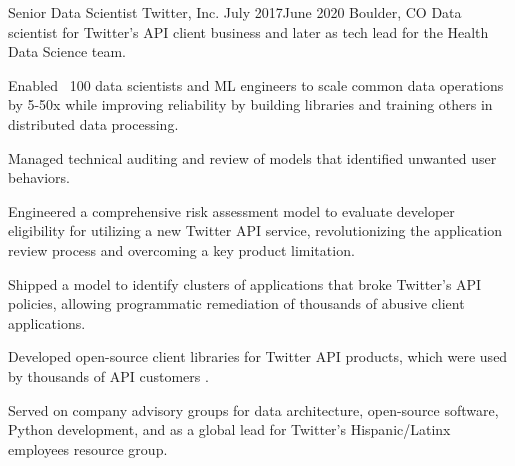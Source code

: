\documentclass[print]{ag-cv} %
\begin{document}
\begin{job}
  {Senior Data Scientist}
  {Twitter, Inc.}
  {July 2017}{June 2020}
  {Boulder, CO}
  {
  Data scientist for Twitter's API client business and later as tech lead for the Health Data Science team. 
  }
{
    \begin{myitemize}
      \item Enabled ~100 data scientists and ML engineers to scale common data operations by 5-50x while improving reliability by
      building libraries and training others in distributed data processing.
      
      \item Managed technical auditing and review of models that identified unwanted user behaviors.
      
      \item Engineered a comprehensive risk assessment model to evaluate
      developer eligibility for utilizing a new Twitter API service,
      revolutionizing the application review process and overcoming a key
      product limitation.
      
      \item Shipped a model to identify clusters of applications that broke Twitter's API
      policies, allowing programmatic remediation of thousands of abusive client applications.

      \item Developed open-source client libraries for Twitter API products, which
      were used by thousands of API customers
      \autocite{search_tweets_python,do_more_with_twitter_data}.
      
      \item Served on company advisory groups for data architecture, open-source
      software, Python development, and as a global lead for Twitter's
      Hispanic/Latinx employees resource group.
    \end{myitemize}
    } 

\end{job}
\end{document}
